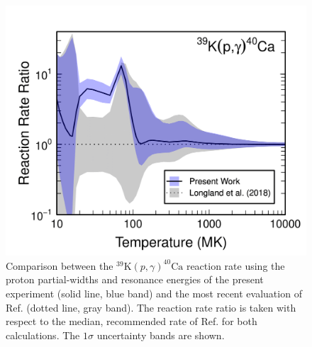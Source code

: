\begin{figure}[t]
\includegraphics[width=6.5in]{Chapter-6/figs/rateCompare.png} %
\caption{\label{fig:rateCompare}Comparison between the $^{39}\mathrm{K}(p, \gamma)^{40}\mathrm{Ca}$ reaction rate using the proton partial-widths and resonance energies of the present experiment (solid line, blue band) and the most recent evaluation of Ref. \cite{Longland2018} (dotted line, gray band). The reaction rate ratio is taken with respect to the median, recommended rate of Ref. \cite{Longland2018} for both calculations. The $1\sigma$ uncertainty bands are shown.}
\end{figure}


